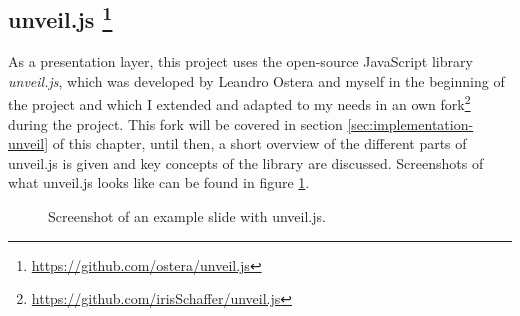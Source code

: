 \subsection[unveil.js]%
             {unveil.js%
             \protect\footnote{\url{https://github.com/ostera/unveil.js}}}    
\label{sec:implementation-technologies-unveil}

As a presentation layer, this project uses the open-source JavaScript library \textit{unveil.js}, which was developed by Leandro Ostera and myself in the beginning of the project and which I extended and adapted to my needs in an own fork\footnote{\url{https://github.com/irisSchaffer/unveil.js}} during the project. This fork will be covered in section \ref{sec:implementation-unveil} of this chapter, until then, a short overview of the different parts of unveil.js is given and key concepts of the library are discussed. Screenshots of what unveil.js looks like can be found in figure \ref{fig:implementation-technologies-unveil-screenshots}.


\begin{figure}
\centering
{}
\caption{Screenshot of an example slide with unveil.js.}
\label{fig:implementation-technologies-unveil-screenshots}
\end{figure}

